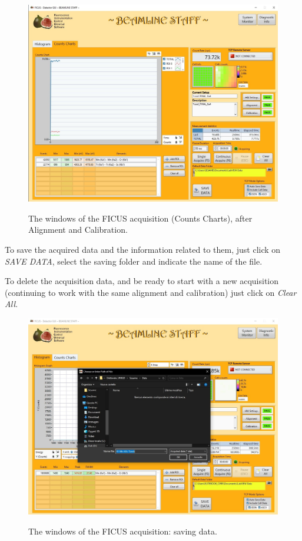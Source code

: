 \documentclass[a4paper,12pt,oneside,pdflatex,italian,final,twocolumn]{article}
\begin{document}
\begin{figure}[h]
\centering
{\includegraphics[width=.8\textwidth]{Capture49.jpg}} \quad
\caption{The windows of the FICUS acquisition (Counts Charts), after Alignment and Calibration.}\label{fig:fig53}
\end{figure}

To save the acquired data and the information related to them, just click on \textit{SAVE DATA}, select the saving folder and indicate the name of the file. 



To delete the acquisition data, and be ready to start with a new acquisition (continuing to work with the same alignment and calibration) just click on \textit{Clear All}.

\clearpage
\begin{figure}[h]
\centering
{\includegraphics[width=.7\textwidth]{Cattura99.jpg}} \quad
\caption{The windows of the FICUS acquisition: saving data.}\label{fig:fig54}
\end{figure}
\end{document}
